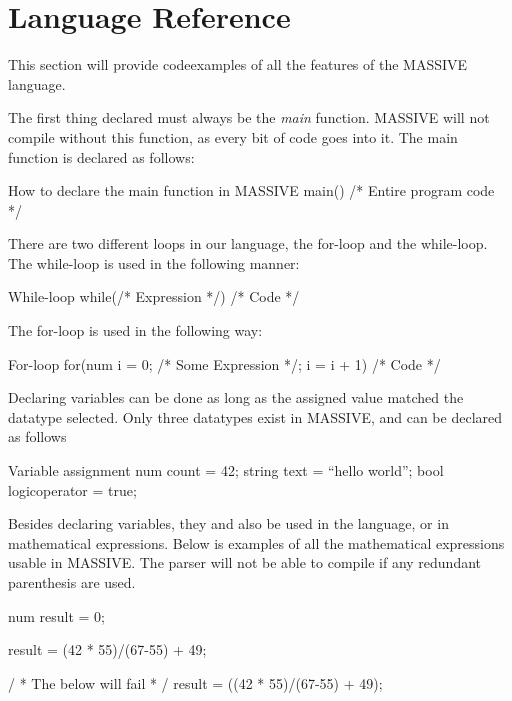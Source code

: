 \section{Language Reference}
\label{sec:language_reference}

This section will provide codeexamples of all the features of the MASSIVE language.

The first thing declared must always be the \textit{main} function. MASSIVE will not compile without this function, as every bit of code goes into it.
The main function is declared as follows:

\begin{source}{How to declare the main function in MASSIVE}{}
main()
{
		/* Entire program code */
}
\end{source}

There are two different loops in our language, the for-loop and the while-loop.\\
The while-loop is used in the following manner:
\begin{source}{While-loop}{}
while(/* Expression */)
{
		/* Code */
}
\end{source}

The for-loop is used in the following way:
\begin{source}{For-loop}{}
for(num i = 0; /* Some Expression */; i = i + 1)
{
		/* Code */
}
\end{source}

Declaring variables can be done as long as the assigned value matched the datatype selected. Only three datatypes exist in MASSIVE, and can be declared as follows

\begin{source}{Variable assignment}{}
num count = 42;
string text = ``hello world'';
bool logicoperator = true;
\end{source}

Besides declaring variables, they and also be used in the language, or in mathematical expressions. Below is examples of all the mathematical expressions usable in MASSIVE. The parser will not be able to compile if any redundant parenthesis are used.

\begin{source}{}{}
num result = 0;

result = (42 * 55)/(67-55) + 49;

/ * The below will fail * /
result = ((42 * 55)/(67-55) + 49);

\end{source}

